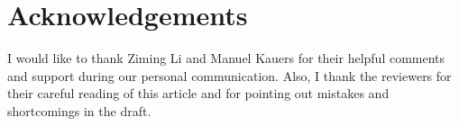 \documentclass[3p,11pt,preprint]{elsarticle}
\begin{document}
\section*{Acknowledgements}
I would like to thank Ziming Li and Manuel Kauers for their helpful comments and support during our personal communication. Also, I thank the reviewers for their careful reading of this article and for pointing out mistakes and shortcomings in the draft.



\end{document}
